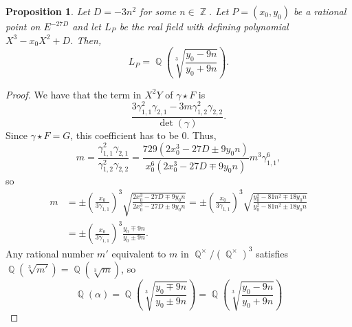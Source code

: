\documentclass[oneside]{amsart}
\newcommand{\embrace}[3]{\left#1 #3 \right#2}
\newcommand{\lpar}[1]{\embrace{(}{)}{#1}}
\DeclareMathOperator{\QQ}{\mathbb{Q}}
\DeclareMathOperator{\ZZ}{\mathbb{Z}}
\newtheorem{proposition}[X]{Proposition}
\theoremstyle{definition}
\begin{document}
\begin{proposition}
    \label{theorem: primitive element}
    Let $D = -3n^2$ for some $n \in \ZZ$. Let $P = (x_0,y_0)$ be a rational point on $E^{-27D}$ and let $L_P$ be the real field with defining polynomial $X^3 - x_0X^2 + D$. Then,
    $$
    L_P = \QQ\lpar{\sqrt[3]{\frac{y_0 - 9n}{y_0 + 9n}}}.
    $$
\end{proposition}
\begin{proof}
We have that the term in $X^2Y$ of $\gamma \star F$ is 
$$
\frac{3\gamma_{1,1}^2\gamma_{2,1}-3m\gamma_{1,2}^2\gamma_{2,2}}{\det(\gamma)}.
$$
Since $\gamma\star F = G$, this coefficient has to be 0. Thus, 
$$
m = \frac{\gamma_{1,1}^2\gamma_{2,1}}{\gamma_{1,2}^2\gamma_{2,2}} = \frac{729(2x_0^3 - 27D \pm 9y_0n)}{x_0^6(2x_0^3 - 27D \mp 9y_0n)}m^3\gamma_{1,1}^6, 
$$
so 
\begin{align*}
    m &= \pm \lpar{\frac{x_0}{3\gamma_{1,1}}}^3\sqrt{\frac{2x_0^3 - 27D \mp 9y_0n}{2x_0^3 - 27D \pm 9y_0n}} = \pm \lpar{\frac{x_0}{3\gamma_{1,1}}}^3\sqrt{\frac{y_0^2 - 81n^2 \mp 18y_0n}{y_0^2 - 81n^2 \pm 18y_0n}}\\
    &= \pm \lpar{\frac{x_0}{3\gamma_{1,1}}}^3\frac{y_0 \mp 9n}{y_0 \pm 9n}.
\end{align*}
Any rational number $m'$ equivalent to $m$ in $\QQ^{\times}/(\QQ^{\times})^3$ satisfies $\QQ(\sqrt[3]{m'}) = \QQ(\sqrt[3]{m})$, so 
$$
\QQ(\alpha) = \QQ\lpar{\sqrt[3]{\frac{y_0 \mp 9n}{y_0 \pm 9n}}} = \QQ\lpar{\sqrt[3]{\frac{y_0 - 9n}{y_0 + 9n}}}
$$
\end{proof} 
\end{document}
